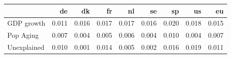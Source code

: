 \begin{tabular}{lrrrrrrrr}
\toprule
{} &     de &     dk &     fr &     nl &     se &     sp &     us &     eu \\
\midrule
GDP growth  &  0.011 &  0.016 &  0.017 &  0.017 &  0.016 &  0.020 &  0.018 &  0.015 \\
Pop Aging   &  0.007 &  0.004 &  0.005 &  0.006 &  0.004 &  0.010 &  0.004 &  0.007 \\
Unexplained &  0.010 &  0.001 &  0.014 &  0.005 &  0.002 &  0.016 &  0.019 &  0.011 \\
\bottomrule
\end{tabular}
